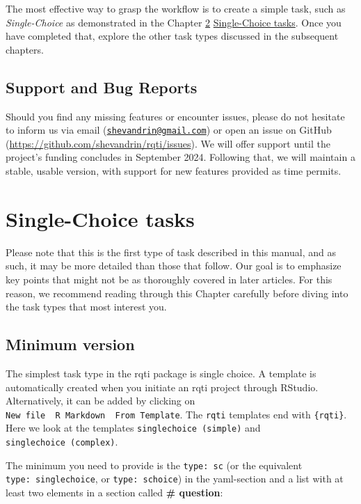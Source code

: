 \documentclass[twoside]{tufte-book}
\begin{document}
The most effective way to grasp the workflow is to create a simple task, such as \emph{Single-Choice} as demonstrated in the Chapter \ref{single-choice-tasks} \href{articles/singlechoice.html}{Single-Choice tasks}. Once you have completed that, explore the other task types discussed in the subsequent chapters.

\section{Support and Bug Reports}\label{support-and-bug-reports}

Should you find any missing features or encounter issues, please do not hesitate to inform us via email (\href{mailto:shevandrin@gmail.com}{\nolinkurl{shevandrin@gmail.com}}) or open an issue on GitHub (\url{https://github.com/shevandrin/rqti/issues}). We will offer support until the project's funding concludes in September 2024. Following that, we will maintain a stable, usable version, with support for new features provided as time permits.

\chapter{Single-Choice tasks}\label{single-choice-tasks}

Please note that this is the first type of task described in this manual, and as such, it may be more detailed than those that follow. Our goal is to emphasize key points that might not be as thoroughly covered in later articles. For this reason, we recommend reading through this Chapter carefully before diving into the task types that most interest you.

\section{Minimum version}\label{minimum-version}

The simplest task type in the rqti package is single choice. A template is automatically created when you initiate an rqti project through RStudio. Alternatively, it can be added by clicking on \texttt{New\ file\ \textrightarrow{}\ R\ Markdown\ \textrightarrow{}\ From\ Template}. The \texttt{rqti} templates end with \texttt{\{rqti\}}. Here we look at the templates \texttt{singlechoice\ (simple)} and \texttt{singlechoice\ (complex)}.

The minimum you need to provide is the \texttt{type:\ sc} (or the equivalent \texttt{type:\ singlechoice}, or \texttt{type:\ schoice}) in the yaml-section and a list with at least two elements in a section called \textbf{\# question}:
\end{document}
